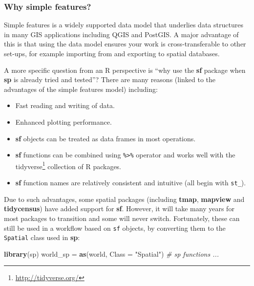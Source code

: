 \documentclass[]{krantz}
\newenvironment{Shaded}{\begin{snugshade}}{\end{snugshade}}
\newcommand{\CommentTok}[1]{\textcolor[rgb]{0.37,0.37,0.37}{\textit{#1}}}
\newcommand{\DataTypeTok}[1]{\textcolor[rgb]{0.27,0.27,0.27}{#1}}
\newcommand{\KeywordTok}[1]{\textcolor[rgb]{0.27,0.27,0.27}{\textbf{#1}}}
\newcommand{\NormalTok}[1]{#1}
\newcommand{\StringTok}[1]{\textcolor[rgb]{0.5,0.5,0.5}{#1}}
\providecommand{\tightlist}{%
  \setlength{\itemsep}{0pt}\setlength{\parskip}{0pt}}
\let\rmarkdownfootnote\footnote%
\def\footnote{\protect\rmarkdownfootnote}
\renewcommand{\href}[2]{#2\footnote{\url{#1}}}
\begin{document}
\hypertarget{why-simple-features}{%
\subsubsection{Why simple features?}\label{why-simple-features}}

Simple features is a widely supported data model that underlies data structures in many GIS applications including QGIS and PostGIS.
A major advantage of this is that using the data model ensures your work is cross-transferable to other set-ups, for example importing from and exporting to spatial databases.

A more specific question from an R perspective is ``why use the \textbf{sf} package when \textbf{sp} is already tried and tested''?
There are many reasons (linked to the advantages of the simple features model) including:

\begin{itemize}
\tightlist
\item
  Fast reading and writing of data.
\item
  Enhanced plotting performance.
\item
  \textbf{sf} objects can be treated as data frames in most operations.
\item
  \textbf{sf} functions can be combined using \texttt{\%\textgreater{}\%} operator and works well with the \href{http://tidyverse.org/}{tidyverse} collection of R packages.
\item
  \textbf{sf} function names are relatively consistent and intuitive (all begin with \texttt{st\_}).
\end{itemize}

Due to such advantages, some spatial packages (including \textbf{tmap}, \textbf{mapview} and \textbf{tidycensus}) have added support for \textbf{sf}.
However, it will take many years for most packages to transition and some will never switch.
Fortunately, these can still be used in a workflow based on \texttt{sf} objects, by converting them to the \texttt{Spatial} class used in \textbf{sp}:

\begin{Shaded}
\begin{Highlighting}[]
\KeywordTok{library}\NormalTok{(sp)}
\NormalTok{world_sp =}\StringTok{ }\KeywordTok{as}\NormalTok{(world, }\DataTypeTok{Class =} \StringTok{"Spatial"}\NormalTok{)}
\CommentTok{# sp functions ...}
\end{Highlighting}
\end{Shaded}
\end{document}
